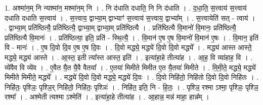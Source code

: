 \documentclass[17pt]{extarticle}
\begin{document}
1. अश्मा॑न॒म् नि न्यश्मा॑न॒ मश्मा॑न॒म् नि । . नि द॑धाति दधाति॒ नि नि द॑धाति । . द॒धा॒ति॒ स॒त्त्वाय॑ स॒त्त्वाय॑ दधाति दधाति स॒त्त्वाय॑ । . स॒त्त्वाय॒ द्वाभ्या॒म् द्वाभ्याꣳ॑ स॒त्त्वाय॑ स॒त्त्वाय॒ द्वाभ्या᳚म् । . स॒त्त्वायेति॑ सत् - त्वाय॑ । . द्वाभ्या॒म् प्रति॑ष्ठित्यै॒ प्रति॑ष्ठित्यै॒ द्वाभ्या॒म् द्वाभ्या॒म् प्रति॑ष्ठित्यै । . प्रति॑ष्ठित्यै वि॒मानो॑ वि॒मानः॒ प्रति॑ष्ठित्यै॒ प्रति॑ष्ठित्यै वि॒मानः॑ । . प्रति॑ष्ठित्या॒ इति॒ प्रति॑ - स्थि॒त्यै॒ । . वि॒मान॑ ए॒ष ए॒ष वि॒मानो॑ वि॒मान॑ ए॒षः । . वि॒मान॒ इति॑ वि - मानः॑ । . ए॒ष दि॒वो दि॒व ए॒ष ए॒ष दि॒वः । . दि॒वो मद्ध्ये॒ मद्ध्ये॑ दि॒वो दि॒वो मद्ध्ये᳚ । . मद्ध्य॑ आस्त आस्ते॒ मद्ध्ये॒ मद्ध्य॑ आस्ते । . आ॒स्त॒ इती त्या᳚स्त आस्त॒ इति॑ । . इत्या॑हा॒हे तीत्या॑ह । . आ॒ह॒ वि व्या॑हाह॒ वि । . व्ये॑वैव वि व्ये॑व । . ए॒वैत यै॒त यै॒वै वैतया᳚ । . ए॒तया॑ मिमीते मिमीत ए॒त यै॒तया॑ मिमीते । . मि॒मी॒ते॒ मद्ध्ये॒ मद्ध्ये॑ मिमीते मिमीते॒ मद्ध्ये᳚ । . मद्ध्ये॑ दि॒वो दि॒वो मद्ध्ये॒ मद्ध्ये॑ दि॒वः । . दि॒वो निहि॑तो॒ निहि॑तो दि॒वो दि॒वो निहि॑तः । . निहि॑तः॒ पृश्ञिः॒ पृश्ञि॒र् निहि॑तो॒ निहि॑तः॒ पृश्ञिः॑ । . निहि॑त॒ इति॒ नि - हि॒तः॒ । . पृश्ञि॒ रश्मा ऽश्मा॒ पृश्ञिः॒ पृश्ञि॒ रश्मा᳚ । . अश्मेती त्यश्मा ऽश्मेति॑ । . इत्या॑हा॒हे तीत्या॑ह । . आ॒हान्न॒ मन्न॑ माहा॒ हान्न᳚म् । \newline
\end{document}
